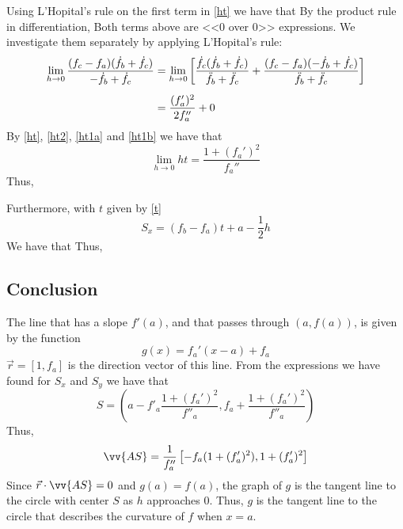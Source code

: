 Using L'Hopital's rule on the first term in \eqref{ht} we have that
By the product rule in differentiation,
Both terms above are <<0 over 0>> expressions. We investigate them separately by applying L'Hopital's rule:
\begin{align}
	\lim\limits_{h\to 0}\frac{(f_c-f_a)(\dot{f}_b+\dot{f}_c)}{-\dot{f}_b+\dot{f}_c}&= \lim\limits_{h\to 0}\left[\frac{\dot{f}_c(\dot{f}_b+\dot{f}_c)}{\ddot{f}_b+\ddot{f}_c}+\frac{(f_c-f_a)(-\dot{f}_b+\dot{f}_c)}{\ddot{f}_b+\ddot{f}_c}\right]\br
	&=\frac{(f_a')^2}{2f_a''}+0 \label{ht1b}
\end{align}
By \eqref{ht}, \eqref{ht2}, \eqref{ht1a} and \eqref{ht1b} we have that
\[ \lim\limits_{h\to0} h t=\frac{1+(f_a')^2}{f_a''} \]
Thus,

Furthermore, with $ t $ given by \eqref{t}
\[ S_x=(f_b-f_a)t+a-\frac{1}{2}h \]
We have that
Thus,
\subsection*{Conclusion}
The line that has a slope $ f'(a) $, and that passes through $ (a, f(a)) $, is given by the function 
\[ g(x)=f_a'(x-a)+f_a \]
$ \vec{r}=[1, f_a] $ is the direction vector of this line. 
From the expressions we have found for $ S_x $ and $ S_y $ we have that
\[ S=\left(a-f'_a\frac{1+(f_a')^2}{f''_a}, f_a+\frac{1+(f_a')^2}{f''_a}\right) \]
Thus,
\[ \vv{AS}= \frac{1}{f_a''}\left[-f_a(1+(f_a')^2), 1+(f_a')^2\right] \]
Since $ {\vec{r}\cdot \vv{AS}=0 }$ and $ {g(a)=f(a)} $, the graph of $ g $ is the tangent line to the circle with center $ S $ as $ h $ approaches 0. Thus, $ g $ is the tangent line to the circle that describes the curvature of $ f $ when $ x=a $.


